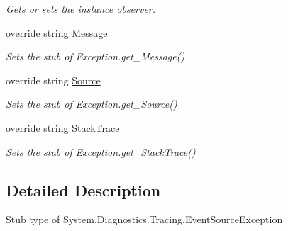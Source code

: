 \begin{DoxyCompactItemize}
\begin{DoxyCompactList}\small\item\em Gets or sets the instance observer.\end{DoxyCompactList}\item 
override string \hyperlink{class_system_1_1_diagnostics_1_1_tracing_1_1_fakes_1_1_stub_event_source_exception_a3a315a9b787304876cebc2bfb59029a7}{Message}
\begin{DoxyCompactList}\small\item\em Sets the stub of Exception.\-get\-\_\-\-Message()\end{DoxyCompactList}\item 
override string \hyperlink{class_system_1_1_diagnostics_1_1_tracing_1_1_fakes_1_1_stub_event_source_exception_a887515c4d50505c4922e1f0651c3bfe3}{Source}
\begin{DoxyCompactList}\small\item\em Sets the stub of Exception.\-get\-\_\-\-Source()\end{DoxyCompactList}\item 
override string \hyperlink{class_system_1_1_diagnostics_1_1_tracing_1_1_fakes_1_1_stub_event_source_exception_a537b85bb2da27a4352bf813a42a8e83e}{Stack\-Trace}
\begin{DoxyCompactList}\small\item\em Sets the stub of Exception.\-get\-\_\-\-Stack\-Trace()\end{DoxyCompactList}\end{DoxyCompactItemize}


\subsection{Detailed Description}
Stub type of System.\-Diagnostics.\-Tracing.\-Event\-Source\-Exception



